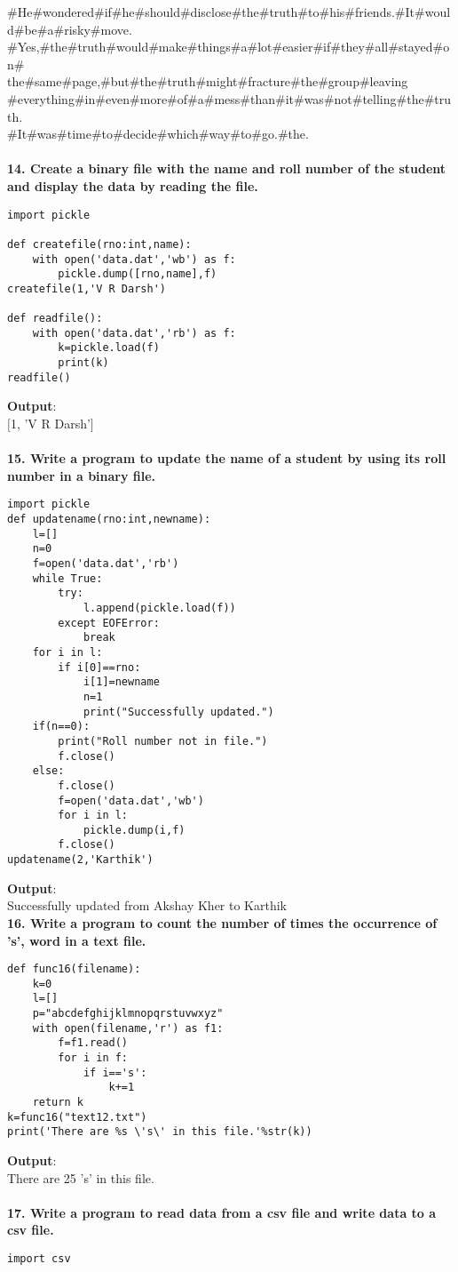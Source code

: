 \documentclass[
a4paper]{article}
\begin{document}
\begin{large}
\#He\#wondered\#if\#he\#should\#disclose\#the\#truth\#to\#his\#friends.\#It\#would\#be\#a\#risky\#move.\\
\#Yes,\#the\#truth\#would\#make\#things\#a\#lot\#easier\#if\#they\#all\#stayed\#on\#\\the\#same\#page,\#but\#the\#truth\#might\#fracture\#the\#group\#leaving\\\#everything\#in\#even\#more\#of\#a\#mess\#than\#it\#was\#not\#telling\#the\#truth.\\\#It\#was\#time\#to\#decide\#which\#way\#to\#go.\#the.\\
\textbf{\\14. Create a binary file with the name and roll number of the student and display the data by reading the file.}
\begin{verbatim}
import pickle

def createfile(rno:int,name):
    with open('data.dat','wb') as f:
        pickle.dump([rno,name],f)
createfile(1,'V R Darsh')

def readfile():
    with open('data.dat','rb') as f:
        k=pickle.load(f)
        print(k)
readfile()
\end{verbatim}
\textbf{Output}:\\
$[$1, 'V R Darsh'$]$\\
\textbf{\\15. Write a pro}\textbf{gram to update the name of a student by using its roll number in a binary file.}
\begin{verbatim}
import pickle
def updatename(rno:int,newname):
    l=[]
    n=0
    f=open('data.dat','rb')
    while True:
        try:
            l.append(pickle.load(f))
        except EOFError:
            break
    for i in l:
        if i[0]==rno:
            i[1]=newname
            n=1
            print("Successfully updated.")
    if(n==0):
        print("Roll number not in file.")
        f.close()
    else:
        f.close()
        f=open('data.dat','wb')
        for i in l:
            pickle.dump(i,f)
        f.close()
updatename(2,'Karthik')
\end{verbatim}
\textbf{Output}:\\
Successfully updated from Akshay Kher to Karthik
\\\textbf{16. Write a program to count the number of times the occurrence of 's', word in a text file.}
\begin{verbatim}
def func16(filename):
    k=0
    l=[]
    p="abcdefghijklmnopqrstuvwxyz"
    with open(filename,'r') as f1:
        f=f1.read()
        for i in f:
            if i=='s':
                k+=1
    return k
k=func16("text12.txt")
print('There are %s \'s\' in this file.'%str(k))    
\end{verbatim}
\textbf{Output}:\\
There are 25 's' in this file.\\
\\ \textbf{17. Write a program to read data from a csv file and write data to a csv file.}
\begin{verbatim}
import csv


\end{verbatim}
\end{large}
\end{document}
